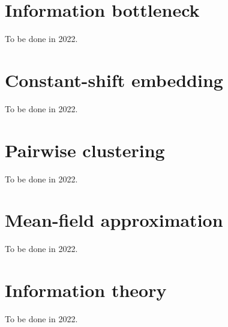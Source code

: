 \documentclass[12pt]{book}
\theoremstyle{definition}
\begin{document}
\maketitle

\newcommand{\todo}[1]{{\color{red} ToDo: #1}}
\newcommand{\prob}{\mathbf{P}}

\newcommand{\dir}{maximum_entropy_posterior_agreement}


\renewcommand{\dir}{simulated_annealing}


\renewcommand{\dir}{deterministic_annealing}


\chapter{Information bottleneck}

To be done in 2022.

\chapter{Constant-shift embedding}

To be done in 2022.

\chapter{Pairwise clustering}

To be done in 2022.

\chapter{Mean-field approximation}

To be done in 2022.

\renewcommand{\dir}{posterior_agreement}





\appendix

\chapter{Information theory}

To be done in 2022.

\renewcommand{\dir}{em_algorithm}

\end{document}
